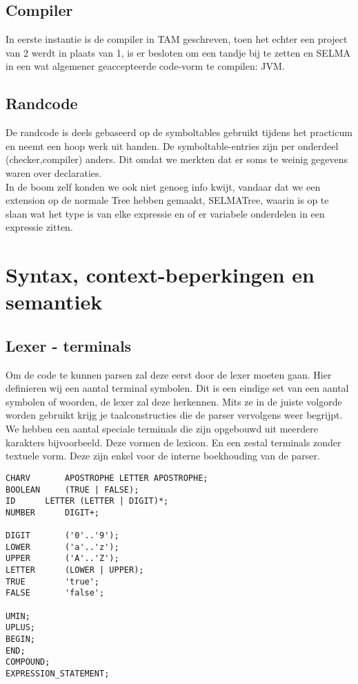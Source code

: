 \documentclass[]{article}
\begin{document}
\subsection{Compiler}
In eerste instantie is de compiler in TAM geschreven, toen het echter een project van 2 werdt in plaats van 1, is er besloten om een tandje bij te zetten en SELMA in een wat algemener geaccepteerde code-vorm te compilen: JVM.\\
\subsection{Randcode}
De randcode is deels gebaseerd op de symboltables gebruikt tijdens het practicum en neemt een hoop werk uit handen. De symboltable-entries zijn per onderdeel (checker,compiler) anders. Dit omdat we merkten dat er soms te weinig gegevens waren over declaraties. \\
In de boom zelf konden we ook niet genoeg info kwijt, vandaar dat we een extension op de normale Tree hebben gemaakt, SELMATree, waarin is op te slaan wat het type is van elke expressie en of er variabele onderdelen in een expressie zitten.

\newpage
\section{Syntax, context-beperkingen en semantiek}


\subsection{Lexer - terminals}
Om de code te kunnen parsen zal deze eerst door de lexer moeten gaan. Hier definieren wij een aantal terminal symbolen. Dit is een eindige set van een aantal symbolen of woorden, de lexer zal deze herkennen. Mits ze in de juiste volgorde worden gebruikt krijg je taalconstructies die de parser vervolgens weer begrijpt. We hebben een aantal speciale terminals die zijn opgebouwd uit meerdere karakters bijvoorbeeld. Deze vormen de lexicon. En een zestal terminals zonder textuele vorm. Deze zijn enkel voor de interne boekhouding van de parser.
\\
\begin{lstlisting}[style=ANTLR]
CHARV		APOSTROPHE LETTER APOSTROPHE;
BOOLEAN		(TRUE | FALSE);
ID		LETTER (LETTER | DIGIT)*;
NUMBER		DIGIT+;
	
DIGIT		('0'..'9');
LOWER		('a'..'z');
UPPER		('A'..'Z');
LETTER		(LOWER | UPPER);
TRUE		'true';
FALSE		'false';

UMIN;
UPLUS;
BEGIN;
END;
COMPOUND;
EXPRESSION_STATEMENT;			
\end{lstlisting}
\end{document}
